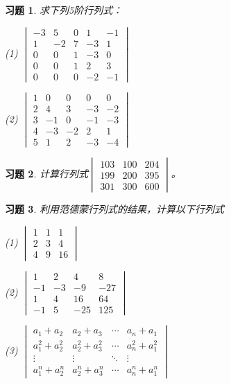 \documentclass[a4paper]{book}
\newtheorem{ex}{习题}[chapter]
\newcommand{\enum}{\begin{list}{}{\setlength{\leftmargin}{0pt} \setlength{\itemindent}{2.5em} \setlength{\listparindent}{2em}}}
\begin{document}
\begin{ex} \label{ex:2.10}
求下列5阶行列式：

\enum
\item[(1)] $\begin{vmatrix} -3 & 5 & 0 & 1 & -1 \\ 1 & -2 & 7 & -3 & 1 \\ 0 & 0 & 1 & -3 & 0 \\ 0 & 0 & 1 & 2 & 3 \\ 0 & 0 & 0 & -2 & -1 \end{vmatrix}$
\item[(2)] $\begin{vmatrix} 1 & 0 & 0 & 0 & 0 \\ 2 & 4 & 3 & -3 & -2 \\ 3 & -1 & 0 & -1 & -3 \\ 4 & -3 & -2 & 2 & 1 \\ 5 & 1 & 2 & -3 & -4 \end{vmatrix}$
\end{list}
\end{ex}

\begin{ex} \label{ex:2.11}
计算行列式$\begin{vmatrix} 103 & 100 & 204 \\ 199 & 200 & 395 \\ 301 & 300 & 600 \end{vmatrix}$。
\end{ex}

\begin{ex} \label{ex:2.12}
利用范德蒙行列式的结果，计算以下行列式

\enum
\item[(1)] $\begin{vmatrix} 1 & 1 & 1 \\ 2 & 3 & 4 \\ 4 & 9 & 16 \end{vmatrix}$
\item[(2)] $\begin{vmatrix} 1 & 2 & 4 & 8 \\ -1 & -3 & -9 & -27 \\ 1 & 4 & 16 & 64 \\ -1 & 5 & -25 & 125 \end{vmatrix}$
\item[(3)] $\begin{vmatrix} a_1 + a_2 & a_2 + a_3 & \cdots & a_n + a_1 \\ a_1^2 + a_2^2 & a_2^2 + a_3^2 & \cdots & a_n^2 + a_1^2 \\ \vdots & \vdots & \ddots & \vdots \\ a_1^n + a_2^n & a_2^n + a_3^n & \cdots & a_n^n + a_1^n \end{vmatrix}$
\end{list}
\end{ex}
\end{document}
